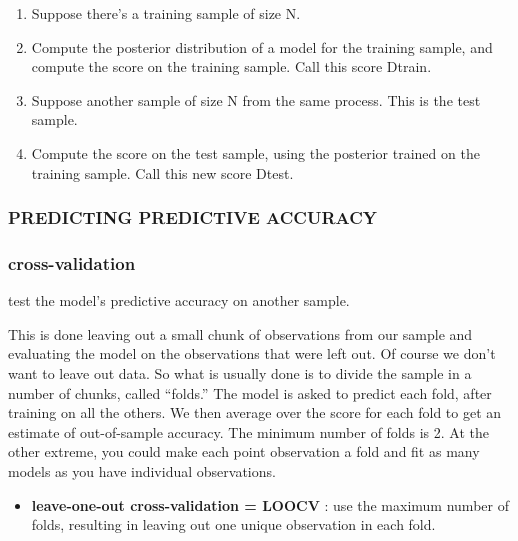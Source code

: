 \documentclass[
]{article}
\providecommand{\tightlist}{%
  \setlength{\itemsep}{0pt}\setlength{\parskip}{0pt}}
\begin{document}
\begin{enumerate}
\def\labelenumi{(\arabic{enumi})}
\tightlist
\item
  Suppose there's a training sample of size N.
\item
  Compute the posterior distribution of a model for the training sample,
  and compute the score on the training sample. Call this score Dtrain.
\item
  Suppose another sample of size N from the same process. This is the
  test sample.
\item
  Compute the score on the test sample, using the posterior trained on
  the training sample. Call this new score Dtest.
\end{enumerate}

\hypertarget{predicting-predictive-accuracy}{%
\subsubsection{PREDICTING PREDICTIVE
ACCURACY}\label{predicting-predictive-accuracy}}

\hypertarget{cross-validation}{%
\subsubsection{cross-validation}\label{cross-validation}}

test the model's predictive accuracy on another sample.

This is done leaving out a small chunk of observations from our sample
and evaluating the model on the observations that were left out. Of
course we don't want to leave out data. So what is usually done is to
divide the sample in a number of chunks, called ``folds.'' The model is
asked to predict each fold, after training on all the others. We then
average over the score for each fold to get an estimate of out-of-sample
accuracy. The minimum number of folds is 2. At the other extreme, you
could make each point observation a fold and fit as many models as you
have individual observations.

\begin{itemize}
\tightlist
\item
  \textbf{leave-one-out cross-validation = LOOCV} : use the maximum
  number of folds, resulting in leaving out one unique observation in
  each fold.
\end{itemize}
\end{document}
